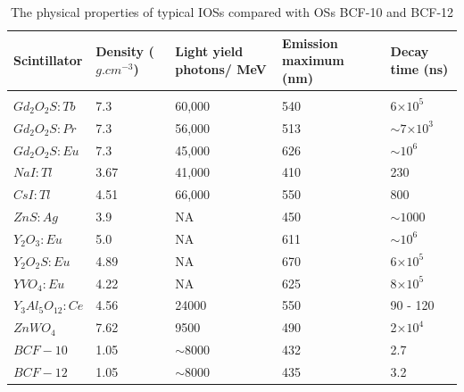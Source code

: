 \documentclass{article}
\begin{document}
\begin{table}[H]
    \centering
    \begin{tabular}{p{3 cm} p{2 cm} p{2 cm} p{2 cm} p{2 cm}}
    \hline
     Scintillator & 
          Density ($g . cm^{−3}$)
         & Light yield photons/ MeV 
         & Emission maximum (nm) 
         & Decay time (ns)\\
    \hline
    \\
    $Gd_2O_2S: Tb$
    &  7.3
    &  60,000  
    & 540
    &6×$10^5$\\
    
    $Gd_2O_2S: Pr$
    &  7.3
    &  56,000  
    & 513
    & $\sim 7$×$10^3$\\
    
    $Gd_2O_2S: Eu$
    &  7.3
    &  45,000  
    & 626
    & $\sim 10^6$\\
    
    $NaI:Tl$
    &  3.67
    &  41,000 
    & 410
    &230\\
    
    $CsI:Tl$
    &  4.51
    &  66,000  
    & 550
    &800\\
    
    $ZnS: Ag$
    &  3.9
    &  NA 
    & 450
    & $\sim 1000$\\
    
    $Y_2O_3:Eu$
    &  5.0
    &  NA  
    & 611
    & $\sim 10^6$\\
    
    $Y_2O_2S:Eu$
    &  4.89
    &  NA 
    & 670
    &6×$10^5$\\
    
    $YVO_4:Eu$
    &  4.22
    &  NA  
    & 625
    &8×$10^5$\\
    
    $Y_3Al_5O_{12}:Ce$
    &  4.56
    &  24000 
    & 550
    &90 - 120\\
    
    $ZnWO_4$
    &  7.62
    &  9500  
    & 490
    &2×$10^4$\\
    
    $BCF-10$
    &  1.05
    &  $\sim 8000$
    & 432
    &2.7\\
    
    $BCF-12$
    &  1.05
    &  $\sim 8000$  
    & 435
    &3.2\\ 
    
    \hline
    
    \end{tabular}
    \caption{The physical properties of typical IOSs compared with OSs BCF-10 and BCF-12}
    \label{tab:my_label}
\end{table}
\end{document}
